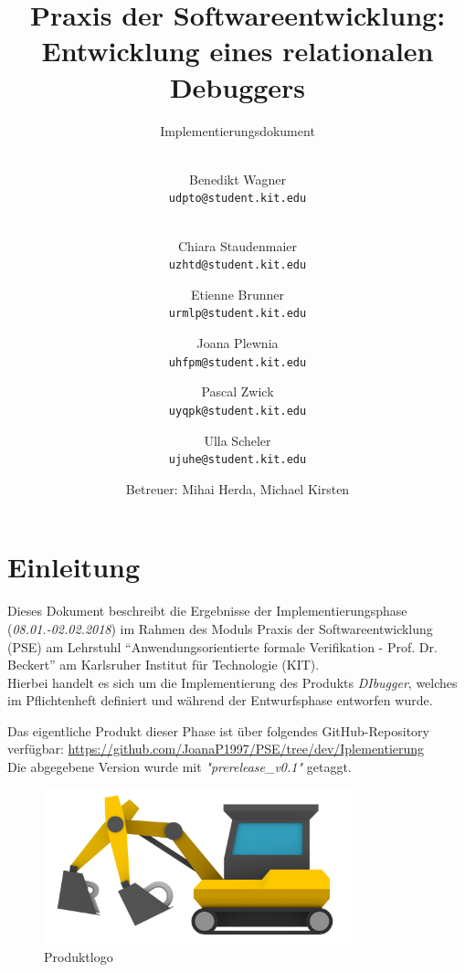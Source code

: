 \documentclass[parskip=full]{scrartcl}
\title{
	\vspace{2cm}
	\myfont 
	Praxis der Softwareentwicklung:\\ 
	Entwicklung eines relationalen Debuggers\\
}
\subtitle{
	\vspace{1cm}
	\myfont
	Implementierungsdokument
}
\author{
	\vspace{1cm} \\
	Benedikt Wagner\\
	\texttt{udpto@student.kit.edu}
	\and \vspace{1cm} \\ Chiara Staudenmaier\\
	\texttt{uzhtd@student.kit.edu}
	\and Etienne Brunner\\
	\texttt{urmlp@student.kit.edu}
	\and Joana Plewnia\\
	\texttt{uhfpm@student.kit.edu} 
	\and Pascal Zwick\\
	\texttt{uyqpk@student.kit.edu}
	\and Ulla Scheler\\
	\texttt{ujuhe@student.kit.edu}
	\vspace{1cm}
	\and Betreuer: Mihai Herda, Michael Kirsten
	\vspace{4cm}
}
\begin{document}
\clearpage
\maketitle
{}
\newpage

\tableofcontents
\newpage
{}

\section{Einleitung}
Dieses Dokument beschreibt die Ergebnisse der Implementierungsphase (\textit{08.01.-02.02.2018}) im Rahmen des Moduls Praxis der Softwareentwicklung (PSE) am Lehrstuhl \enquote{Anwendungsorientierte formale Verifikation - Prof. Dr. Beckert} am Karlsruher Institut für Technologie (KIT).\\
Hierbei handelt es sich um die Implementierung des Produkts \textit{DIbugger}, welches im Pflichtenheft definiert und während der Entwurfsphase entworfen wurde.

Das eigentliche Produkt dieser Phase ist über folgendes GitHub-Repository verfügbar: \href{https://github.com/JoanaP1997/PSE/tree/dev/Iplementierung}{https://github.com/JoanaP1997/PSE/tree/dev/Iplementierung} \\
Die abgegebene Version wurde mit \textit{"prerelease\_v0.1"} getaggt.

\begin{figure}[!h]
\centering
\includegraphics[width=0.8\textwidth]{../Plichtenheft/logo_nongi.png}
\caption{Produktlogo}
\end{figure}
\end{document}
